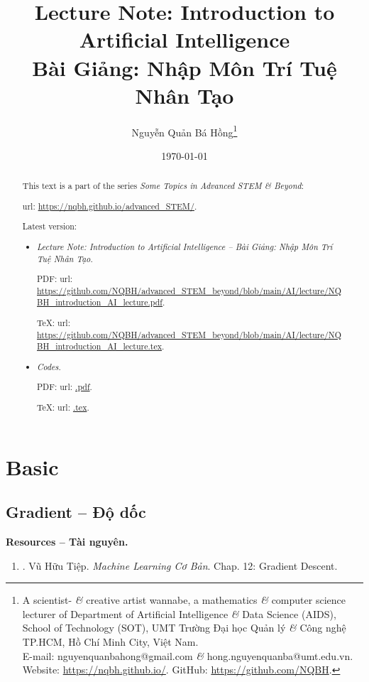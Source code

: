 \documentclass{article}
\title{Lecture Note: Introduction to Artificial Intelligence\\Bài Giảng: Nhập Môn Trí Tuệ Nhân Tạo}
\author{Nguyễn Quản Bá Hồng\footnote{A scientist- {\it\&} creative artist wannabe, a mathematics {\it\&} computer science lecturer of Department of Artificial Intelligence {\it\&} Data Science (AIDS), School of Technology (SOT), UMT Trường Đại học Quản lý {\it\&} Công nghệ TP.HCM, Hồ Chí Minh City, Việt Nam.\\E-mail: {\sf nguyenquanbahong@gmail.com} {\it\&} {\sf hong.nguyenquanba@umt.edu.vn}. Website: \url{https://nqbh.github.io/}. GitHub: \url{https://github.com/NQBH}.}}
\date{\today}
\begin{document}
\maketitle
\begin{abstract}
	This text is a part of the series {\it Some Topics in Advanced STEM \& Beyond}:
	
	{\sc url}: \url{https://nqbh.github.io/advanced_STEM/}.
	
	Latest version:
	\begin{itemize}
		\item {\it Lecture Note: Introduction to Artificial Intelligence -- Bài Giảng: Nhập Môn Trí Tuệ Nhân Tạo}.
		
		PDF: {\sc url}: \url{https://github.com/NQBH/advanced_STEM_beyond/blob/main/AI/lecture/NQBH_introduction_AI_lecture.pdf}.
		
		\TeX: {\sc url}: \url{https://github.com/NQBH/advanced_STEM_beyond/blob/main/AI/lecture/NQBH_introduction_AI_lecture.tex}.
		\item {\it Codes}.
		
		PDF: {\sc url}: \url{.pdf}.
		
		\TeX: {\sc url}: \url{.tex}.
	\end{itemize}
\end{abstract}
\tableofcontents


\section{Basic}

\subsection{Gradient -- Độ dốc}
\textbf{\textsf{Resources -- Tài nguyên.}}
\begin{enumerate}
	\item \cite{Tiep_ML_co_ban}. {\sc Vũ Hữu Tiệp}. {\it Machine Learning Cơ Bản}. Chap. 12: Gradient Descent.
\end{enumerate}
\end{document}
